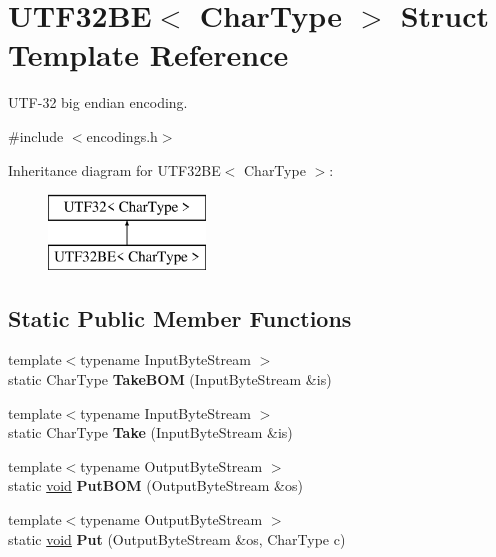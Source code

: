 \hypertarget{struct_u_t_f32_b_e}{}\section{U\+T\+F32\+B\+E$<$ Char\+Type $>$ Struct Template Reference}
\label{struct_u_t_f32_b_e}


U\+T\+F-\/32 big endian encoding.  




{\ttfamily \#include $<$encodings.\+h$>$}

Inheritance diagram for U\+T\+F32\+B\+E$<$ Char\+Type $>$\+:\begin{figure}[H]
\begin{center}
\leavevmode
\includegraphics[height=2.000000cm]{struct_u_t_f32_b_e}
\end{center}
\end{figure}
\subsection*{Static Public Member Functions}
\begin{DoxyCompactItemize}
\item 
\hypertarget{struct_u_t_f32_b_e_a07d228f51ad43ef83af2529ca4bd1181}{}{\footnotesize template$<$typename Input\+Byte\+Stream $>$ }\\static Char\+Type {\bfseries Take\+B\+O\+M} (Input\+Byte\+Stream \&is)\label{struct_u_t_f32_b_e_a07d228f51ad43ef83af2529ca4bd1181}

\item 
\hypertarget{struct_u_t_f32_b_e_ace3086ece3b13417c758b5abcf3016c8}{}{\footnotesize template$<$typename Input\+Byte\+Stream $>$ }\\static Char\+Type {\bfseries Take} (Input\+Byte\+Stream \&is)\label{struct_u_t_f32_b_e_ace3086ece3b13417c758b5abcf3016c8}

\item 
\hypertarget{struct_u_t_f32_b_e_a8b1a216dd267ff06a9000cbe593ebd24}{}{\footnotesize template$<$typename Output\+Byte\+Stream $>$ }\\static \hyperlink{_s_d_l__audio_8h_a52835ae37c4bb905b903cbaf5d04b05f}{void} {\bfseries Put\+B\+O\+M} (Output\+Byte\+Stream \&os)\label{struct_u_t_f32_b_e_a8b1a216dd267ff06a9000cbe593ebd24}

\item 
\hypertarget{struct_u_t_f32_b_e_ad270b8b016d477f7f7354df535fa28c5}{}{\footnotesize template$<$typename Output\+Byte\+Stream $>$ }\\static \hyperlink{_s_d_l__audio_8h_a52835ae37c4bb905b903cbaf5d04b05f}{void} {\bfseries Put} (Output\+Byte\+Stream \&os, Char\+Type c)\label{struct_u_t_f32_b_e_ad270b8b016d477f7f7354df535fa28c5}

\end{DoxyCompactItemize}
